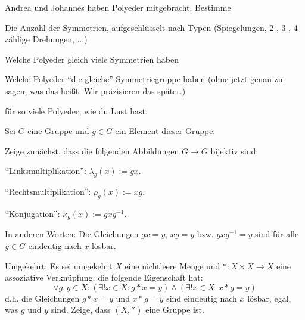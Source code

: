 \begin{sheet}

\begin{problem}
Andrea und Johannes haben Polyeder mitgebracht. Bestimme
\begin{subproblem}
Die Anzahl der Symmetrien, aufgeschlüsselt nach Typen (Spiegelungen, 2-, 3-, 4-zählige Drehungen, ...)
\end{subproblem}
\begin{subproblem}
Welche Polyeder gleich viele Symmetrien haben
\end{subproblem}
\begin{subproblem}
Welche Polyeder \enquote{die gleiche} Symmetriegruppe haben (ohne jetzt genau zu sagen, was das heißt. Wir präzisieren das später.)
\end{subproblem}
für so viele Polyeder, wie du Lust hast.
\end{problem}

\begin{problem}
Sei $G$ eine Gruppe und $g\in G$ ein Element dieser Gruppe.

Zeige zunächst, dass die folgenden Abbildungen $G\to G$ bijektiv sind:
\begin{subproblem}
\enquote{Linksmultiplikation}: $\lambda_g(x):=gx$.
\end{subproblem}
\begin{subproblem}
\enquote{Rechtsmultiplikation}: $\rho_g(x):=xg$.
\end{subproblem}
\begin{subproblem}
\enquote{Konjugation}: $\kappa_g(x):=gxg^{-1}$.
\end{subproblem}
In anderen Worten: Die Gleichungen $gx=y$, $xg=y$ bzw. $gxg^{-1} = y$ sind für alle $y\in G$ eindeutig nach $x$ lösbar.

\begin{subproblem}[difficulty={mittel}]
Umgekehrt: Es sei umgekehrt $X$ eine nichtleere Menge und $\ast: X\times X\to X$ eine assoziative Verknüpfung, die folgende Eigenschaft hat:
\[\forall g,y\in X: (\exists! x\in X: g \ast x=y) \wedge (\exists! x\in X: x \ast g=y)\]
d.h. die Gleichungen $g \ast x=y$ und $x \ast g=y$ sind eindeutig nach $x$ lösbar, egal, was $g$ und $y$ sind. Zeige, dass $(X,\ast)$ eine Gruppe ist.
\end{subproblem}
\end{problem}


\end{sheet}
